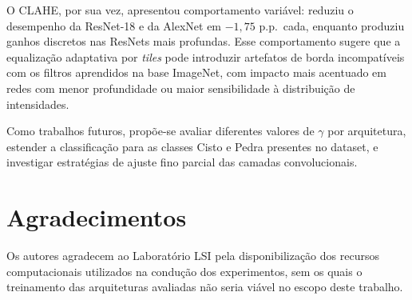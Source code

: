 \documentclass[conference]{IEEEtran}
\begin{document}
O CLAHE, por sua vez, apresentou comportamento variável: reduziu o desempenho
da ResNet-18 e da AlexNet em $-1{,}75$ p.p.\ cada, enquanto produziu ganhos
discretos nas ResNets mais profundas. Esse comportamento sugere que a
equalização adaptativa por \textit{tiles} pode introduzir artefatos de borda
incompatíveis com os filtros aprendidos na base ImageNet, com impacto mais
acentuado em redes com menor profundidade ou maior sensibilidade à distribuição
de intensidades.

Como trabalhos futuros, propõe-se avaliar diferentes valores de $\gamma$ por
arquitetura, estender a classificação para as classes Cisto e Pedra presentes
no dataset, e investigar estratégias de ajuste fino parcial das camadas
convolucionais.

\section*{Agradecimentos}

Os autores agradecem ao Laboratório LSI pela disponibilização dos recursos
computacionais utilizados na condução dos experimentos, sem os quais o
treinamento das arquiteturas avaliadas não seria viável no escopo deste trabalho.
\end{document}
